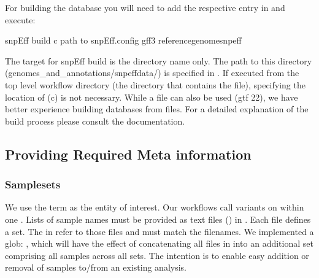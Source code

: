 \documentclass[letterpaper,10pt,english]{sphinxhowto}
\begin{document}
For building the database you will need to add the respective entry in  and execute:

\begin{sphinxVerbatim}[commandchars=\\\{\}]
\PYGZdl{} snpEff build \PYGZhy{}c \PYGZlt{}path to snpEff.config\PYGZgt{} \textendash{}gff3 \PYGZlt{}reference\PYGZhy{}genome\PYGZgt{}\PYGZus{}snpeff
\end{sphinxVerbatim}

The target for snpEff build is the directory name only. The path to this directory (genomes\_and\_annotations/snpeffdata/) is specified in . If executed from the top level workflow directory (the directory that contains the  file), specifying the location of  (\sphinxhyphen{}c) is not necessary.
While a  file can also be used (\sphinxhyphen{}gtf 22), we have better experience building databases from  files. For a detailed explanation of the  build process please consult the  documentation.


\subsection{Providing Required Meta information}
\label{\detokenize{index:providing-required-meta-information}}

\subsubsection{Samplesets}
\label{\detokenize{index:samplesets}}
We use the term  as the entity of interest. Our workflows call variants on  within one . Lists of sample names must be provided as text files () in . Each file defines a set. The  in  refer to those files and must match the filenames. We implemented a glob: , which will have the effect of concatenating all  files in  into an additional set comprising all samples across all sets. The intention is to enable easy addition or removal of samples to/from an existing analysis.
\end{document}

